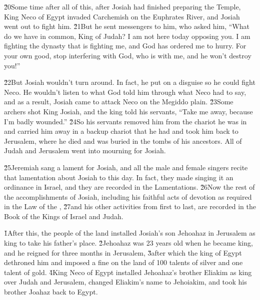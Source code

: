 \v{20}Some time after all of this, after Josiah had finished preparing the Temple, King Neco of Egypt invaded Carchemish on the Euphrates River, and Josiah went out to fight him. \v{21}But he sent messengers to him, who asked him, ``What do we have in common, King of Judah? I am not here today opposing you. I am fighting the dynasty that is fighting me, and God has ordered me to hurry. For your own good, stop interfering with God, who is with me, and he won't destroy you!''

\v{22}But Josiah wouldn't turn around. In fact, he put on a disguise so he could fight Neco. He wouldn't listen to what God told him through what Neco had to say, and as a result, Josiah came to attack Neco on the Megiddo plain. \v{23}Some archers shot King Josiah, and the king told his servants, ``Take me away, because I'm badly wounded.'' \v{24}So his servants removed him from the chariot he was in and carried him away in a backup chariot that he had and took him back to Jerusalem, where he died and was buried in the tombs of his ancestors. All of Judah and Jerusalem went into mourning for Josiah.

\v{25}Jeremiah sang a lament for Josiah, and all the male and female singers recite that lamentation about Josiah to this day. In fact, they made singing it an ordinance in Israel, and they are recorded in the Lamentations. \v{26}Now the rest of the accomplishments of Josiah, including his faithful acts of devotion as required in the Law of the , \v{27}and his other activities from first to last, are recorded in the Book of the Kings of Israel and Judah.

\v{1}After this, the people of the land installed Josiah's son Jehoahaz in Jerusalem as king to take his father's place. \v{2}Jehoahaz was 23 years old when he became king, and he reigned for three months in Jerusalem, \v{3}after which the king of Egypt dethroned him and imposed a fine on the land of 100 talents of silver and one talent of gold. \v{4}King Neco of Egypt installed Jehoahaz's brother Eliakim as king over Judah and Jerusalem, changed Eliakim's name to Jehoiakim, and took his brother Joahaz back to Egypt.


